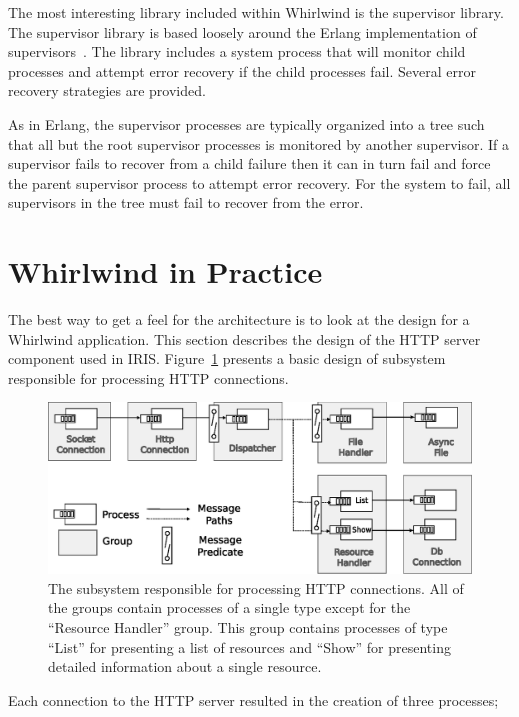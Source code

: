 \documentclass[conference]{IEEEtran}
\begin{document}
The most interesting library included within Whirlwind is the supervisor library. The supervisor library is based loosely around the Erlang implementation of supervisors~\cite{Armstrong03Thesis}. The library includes a system process that will monitor child processes and attempt error recovery if the child processes fail. Several error recovery strategies are provided. 

As in Erlang, the supervisor processes are typically organized into a tree such that all but the root supervisor processes is monitored by another supervisor. If a supervisor fails to recover from a child failure then it can in turn fail and force the parent supervisor process to attempt error recovery. For the system to fail, all supervisors in the tree must fail to recover from the error. 

\section{Whirlwind in Practice}

The best way to get a feel for the architecture is to look at the design for a Whirlwind application. This section describes the design of the HTTP server component used in IRIS. Figure~\ref{figure:http-server} presents a basic design of subsystem responsible for processing HTTP connections.

\begin{figure}[htbp]
\centering
\includegraphics[width=\textwidth]{http-server.eps}
\caption{The subsystem responsible for processing HTTP connections. All of the groups contain processes of a single type except for the ``Resource Handler'' group. This group contains processes of type ``List'' for presenting a list of resources and ``Show'' for presenting detailed information about a single resource.}
\label{figure:http-server}
\end{figure} 

Each connection to the HTTP server resulted in the creation of three processes;
\end{document}
